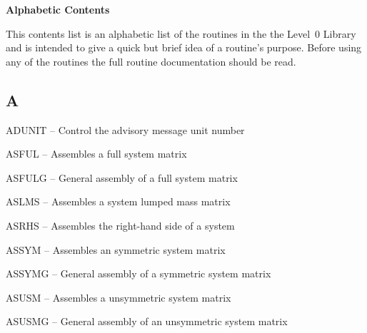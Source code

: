 %
\vspace*{5mm}\centerline{\bf Alphabetic Contents}\vspace*{5mm}
This contents list is an alphabetic list of the routines in the
the Level~0 Library and is intended to give a quick but brief idea
of a routine's purpose. Before using any of the routines the full
routine documentation should be read.

\bigskip
\subsection*{A} %
\begin{list}{}{\leftmargin=80pt  \itemsep=0pt}
\item[ADUNIT \hfill] -- Control the advisory message unit number
\item[ASFUL \hfill]  -- Assembles a full system matrix
\item[ASFULG \hfill] -- General assembly of a full system matrix
\item[ASLMS \hfill]  -- Assembles a system lumped mass matrix
\item[ASRHS \hfill]  -- Assembles the right-hand side of a system
\item[ASSYM \hfill]  -- Assembles an symmetric system matrix
\item[ASSYMG \hfill] -- General assembly of a symmetric system matrix
\item[ASUSM \hfill]  -- Assembles a unsymmetric system matrix
\item[ASUSMG \hfill] -- General assembly of an unsymmetric system matrix
\end{list}
